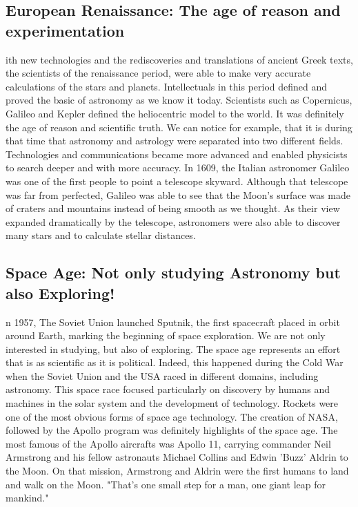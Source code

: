 \subsection{European Renaissance: The age of reason and experimentation}
ith new technologies and the rediscoveries and translations of ancient Greek texts, the scientists of the renaissance period, were able to make very accurate calculations of the stars and planets.
Intellectuals in this period defined and proved the basic of astronomy as we know it today.  
Scientists such as Copernicus, Galileo and Kepler defined the heliocentric model to the world. 
It was definitely the age of reason and scientific truth. 
We can notice for example, that it is during that time that astronomy and astrology were separated into two different fields. 
Technologies and communications became more advanced and enabled physicists to search deeper and with more accuracy. 
In 1609, the Italian astronomer Galileo was one of the first people to point a telescope skyward. 
Although that telescope was far from perfected, Galileo was able to see that the Moon's surface was made of craters and mountains instead of being smooth as we thought.
As their view expanded dramatically by the telescope, astronomers were also able to discover many stars and to calculate stellar distances.
\cite{GalileoTelescope}

\subsection{Space Age: Not only studying Astronomy but also Exploring!}
n 1957, The Soviet Union launched Sputnik, the first spacecraft placed in orbit around Earth, marking the beginning of space exploration.
We are not only interested in studying, but also of exploring.
The space age represents an effort that is as scientific as it is political.
Indeed, this happened during the Cold War when the Soviet Union and the USA raced in different domains, including astronomy.
This space race focused particularly on discovery by humans and machines in the solar system and the development of technology.
Rockets were one of the most obvious forms of space age technology.
The creation of NASA, followed by the Apollo program was definitely highlights of the space age.
The most famous of the Apollo aircrafts was Apollo 11, carrying commander Neil Armstrong and his fellow astronauts Michael Collins and Edwin 'Buzz' Aldrin to the Moon.
On that mission, Armstrong and Aldrin were the first humans to land and walk on the Moon.
"That's one small step for a man, one giant leap for mankind."
\cite{SpaceAge}